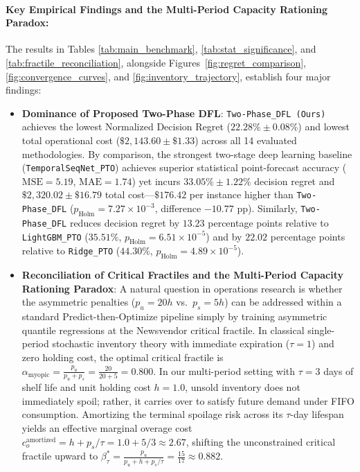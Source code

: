 \documentclass[11pt,a4paper]{article}
\theoremstyle{definition}
\theoremstyle{remark}
\begin{document}
\paragraph{Key Empirical Findings and the Multi-Period Capacity Rationing Paradox:}
The results in Tables \ref{tab:main_benchmark}, \ref{tab:stat_significance}, and \ref{tab:fractile_reconciliation}, alongside Figures~\ref{fig:regret_comparison}, \ref{fig:convergence_curves}, and \ref{fig:inventory_trajectory}, establish four major findings:
\begin{itemize}[leftmargin=*]
    \item \textbf{Dominance of Proposed Two-Phase DFL}: \texttt{Two-Phase\_DFL (Ours)} achieves the lowest Normalized Decision Regret ($22.28\% \pm 0.08\%$) and lowest total operational cost ($\$2,143.60 \pm \$1.33$) across all 14 evaluated methodologies. By comparison, the strongest two-stage deep learning baseline (\texttt{TemporalSeqNet\_PTO}) achieves superior statistical point-forecast accuracy ($\text{MSE} = 5.19$, $\text{MAE} = 1.74$) yet incurs $33.05\% \pm 1.22\%$ decision regret and $\$2,320.02 \pm \$16.79$ total cost—$\$176.42$ per instance higher than \texttt{Two-Phase\_DFL} ($p_{\text{Holm}} = 7.27 \times 10^{-3}$, difference $-10.77$ pp). Similarly, \texttt{Two-Phase\_DFL} reduces decision regret by $13.23$ percentage points relative to \texttt{LightGBM\_PTO} ($35.51\%$, $p_{\text{Holm}} = 6.51 \times 10^{-5}$) and by $22.02$ percentage points relative to \texttt{Ridge\_PTO} ($44.30\%$, $p_{\text{Holm}} = 4.89 \times 10^{-5}$).
    \item \textbf{Reconciliation of Critical Fractiles and the Multi-Period Capacity Rationing Paradox}: A natural question in operations research is whether the asymmetric penalties ($p_u = 20h$ vs.\ $p_s = 5h$) can be addressed within a standard Predict-then-Optimize pipeline simply by training asymmetric quantile regressions at the Newsvendor critical fractile. In classical single-period stochastic inventory theory with immediate expiration ($\tau=1$) and zero holding cost, the optimal critical fractile is $\alpha_{\text{myopic}} = \frac{p_u}{p_u + p_s} = \frac{20}{20 + 5} = 0.800$. In our multi-period setting with $\tau = 3$ days of shelf life and unit holding cost $h = 1.0$, unsold inventory does not immediately spoil; rather, it carries over to satisfy future demand under FIFO consumption. Amortizing the terminal spoilage risk across its $\tau$-day lifespan yields an effective marginal overage cost $c_o^{\text{amortized}} = h + p_s/\tau = 1.0 + 5/3 \approx 2.67$, shifting the unconstrained critical fractile upward to $\beta_\tau^* = \frac{p_u}{p_u + h + p_s/\tau} = \frac{15}{17} \approx 0.882$.


\end{itemize}
\end{document}
